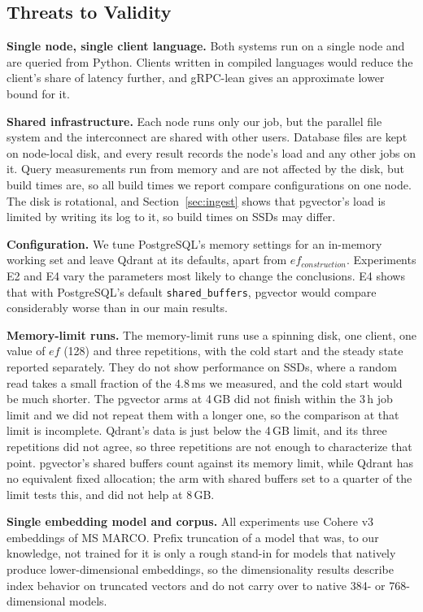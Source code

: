 \documentclass[preprint,12pt]{elsarticle}
\begin{document}
\subsection{Threats to Validity}
\label{sec:threats}

\textbf{Single node, single client language.} Both systems run on a single node and are
queried from Python. Clients written in compiled languages would reduce the client's
share of latency further, and gRPC-lean gives an approximate lower bound for it.

\textbf{Shared infrastructure.} Each node runs only our job, but the parallel file
system and the interconnect are shared with other users. Database files are kept on
node-local disk, and every result records the node's load and any other jobs on it.
Query measurements run from memory and are not affected by the disk, but build times
are, so all build times we report compare configurations on one node. The disk is
rotational, and Section~\ref{sec:ingest} shows that pgvector's load is limited by writing
its log to it, so build times on SSDs may differ.

\textbf{Configuration.} We tune PostgreSQL's memory settings for an in-memory working
set and leave Qdrant at its defaults, apart from $ef_{construction}$. Experiments E2 and
E4 vary the parameters most likely to change the conclusions. E4 shows that with
PostgreSQL's default \texttt{shared\_buffers}, pgvector would compare considerably worse
than in our main results.

\textbf{Memory-limit runs.} The memory-limit runs use a spinning disk, one client, one
value of $ef$ (128) and three repetitions, with the cold start and the steady state
reported separately. They do not show performance on SSDs, where a random read takes a
small fraction of the 4.8\,ms we measured, and the cold start would be much shorter. The
pgvector arms at 4\,GB did not finish within the 3\,h job limit and we did not repeat
them with a longer one, so the comparison at that limit is incomplete. Qdrant's data is
just below the 4\,GB limit, and its three repetitions did not agree, so three
repetitions are not enough to characterize that point. pgvector's shared buffers count
against its memory limit, while Qdrant has no equivalent fixed allocation; the arm with
shared buffers set to a quarter of the limit tests this, and did not help at 8\,GB.

\textbf{Single embedding model and corpus.} All experiments use Cohere v3 embeddings of
MS MARCO. Prefix truncation of a model that was, to our knowledge, not trained for it is
only a rough stand-in for models that natively produce lower-dimensional embeddings, so
the dimensionality results describe index behavior on truncated vectors and do not carry
over to native 384- or 768-dimensional models.
\end{document}
